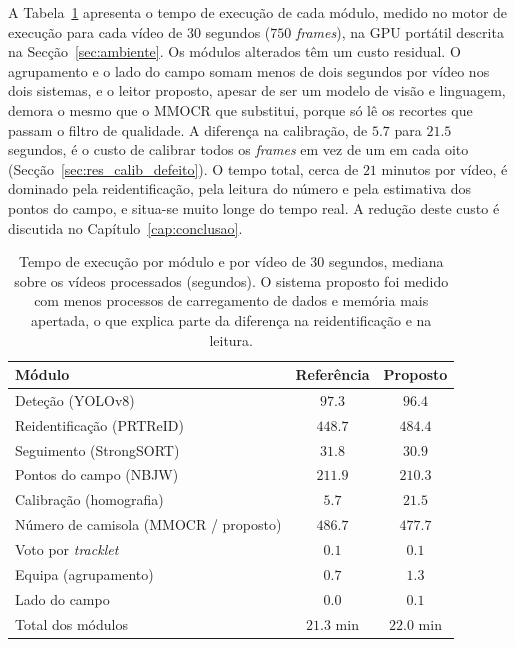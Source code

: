 A Tabela~\ref{tab:tempos} apresenta o tempo de execução de cada módulo, medido no motor de execução
para cada vídeo de $30$ segundos ($750$ \emph{frames}), na GPU portátil descrita na
Secção~\ref{sec:ambiente}. Os módulos alterados têm um custo residual. O agrupamento e o lado do
campo somam menos de dois segundos por vídeo nos dois sistemas, e o leitor proposto, apesar de ser
um modelo de visão e linguagem, demora o mesmo que o MMOCR que substitui, porque só lê os recortes
que passam o filtro de qualidade. A diferença na calibração, de $5.7$ para $21.5$ segundos, é o custo
de calibrar todos os \emph{frames} em vez de um em cada oito (Secção~\ref{sec:res_calib_defeito}).
O tempo total, cerca de $21$ minutos por vídeo, é dominado pela reidentificação, pela leitura do
número e pela estimativa dos pontos do campo, e situa-se muito longe do tempo real. A redução deste
custo é discutida no Capítulo~\ref{cap:conclusao}.

\begin{table}[htbp]
    \centering
    \caption{Tempo de execução por módulo e por vídeo de $30$ segundos, mediana sobre os vídeos
    processados (segundos). O sistema proposto foi medido com menos processos de carregamento de
    dados e memória mais apertada, o que explica parte da diferença na reidentificação e na leitura.}
    \label{tab:tempos}
    \begin{tabular}{|l|c|c|}
        \hline
        \textbf{Módulo} & \textbf{Referência} & \textbf{Proposto} \\
        \hline
        Deteção (YOLOv8)                          & $97.3$  & $96.4$ \\
        \hline
        Reidentificação (PRTReID)                 & $448.7$ & $484.4$ \\
        \hline
        Seguimento (StrongSORT)                   & $31.8$  & $30.9$ \\
        \hline
        Pontos do campo (NBJW)                    & $211.9$ & $210.3$ \\
        \hline
        Calibração (homografia)                   & $5.7$   & $21.5$ \\
        \hline
        Número de camisola (MMOCR / proposto)     & $486.7$ & $477.7$ \\
        \hline
        Voto por \emph{tracklet}                  & $0.1$   & $0.1$ \\
        \hline
        Equipa (agrupamento)                      & $0.7$   & $1.3$ \\
        \hline
        Lado do campo                             & $0.0$   & $0.1$ \\
        \hline
        Total dos módulos                         & $21.3$ min & $22.0$ min \\
        \hline
    \end{tabular}
\end{table}

